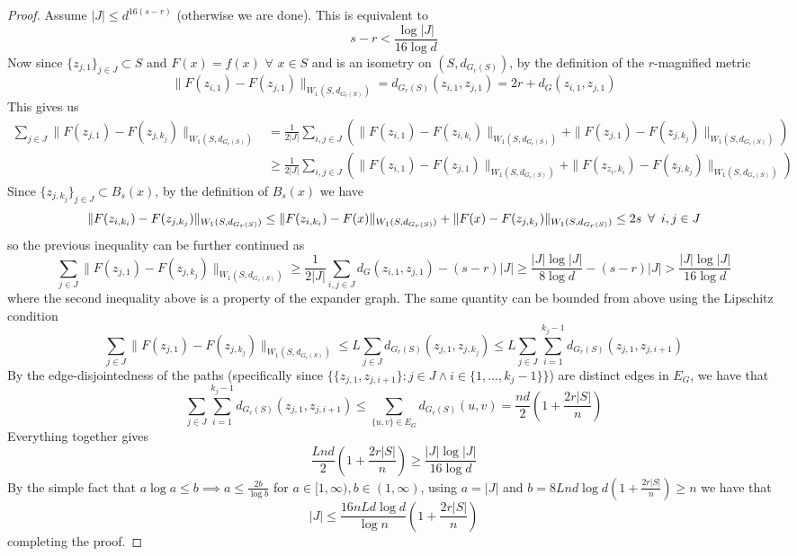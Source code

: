 \begin{proof}
Assume $|J|\le d^{16(s-r)}$ (otherwise we are done). This is equivalent to 
$$s-r<\frac{\log|J|}{16\log d}$$
Now since $\{z_{j,1}\}_{j\in J}\subset S$ and $F(x)=f(x)$ $\forall$ $x\in S$ and is an isometry on $(S,d_{G_r(S)})$, by the definition of the $r$-magnified metric
$$\|F(z_{i,1})-F(z_{j,1})\|_{W_1(S,d_{G_r(S)})}=d_{G_r(S)}(z_{i,1},z_{j,1})=2r+d_G(z_{i,1},z_{j,1})$$
This gives us
\begin{align*}
\sum\limits_{j\in J}\|F(z_{j,1})-F(z_{j,k_j})\|_{W_1(S,d_{G_r(S)})}&=\frac{1}{2|J|}\sum\limits_{i,j\in J}\left(\|F(z_{i,1})-F(z_{i,k_i})\|_{W_1(S,d_{G_r(S)})}+\|F(z_{j,1})-F(z_{j,k_j})\|_{W_1(S,d_{G_r(S)})}\right)\\
&\ge\frac{1}{2|J|}\sum\limits_{i,j\in J}\left(\|F(z_{i,1})-F(z_{j,1})\|_{W_1(S,d_{G_r(S)})}+\|F(z_{z_i,k_i})-F(z_{j,k_j})\|_{W_1(S,d_{G_r(S)})}\right)
\end{align*}
Since $\{z_{j,k_j}\}_{j\in J}\subset B_s(x)$, by the definition of $B_s(x)$ we have 
$$\|F(z_{i,k_i})-F(z_{j,k_j})\|_{W_1(S,d_{G_r(S)})}\le\|F(z_{i,k_i})-F(x)\|_{W_1(S,d_{G_r(S)})}+\|F(x)-F(z_{j,k_j})\|_{W_1(S,d_{G_r(S)})}\le 2s\enskip\forall\enskip i,j\in J$$
so the previous inequality can be further continued as
$$\sum\limits_{j\in J}\|F(z_{j,1})-F(z_{j,k_j})\|_{W_1(S,d_{G_r(S)})}\ge\frac{1}{2|J|}\sum\limits_{i,j\in J}d_G(z_{i,1},z_{j,1})-(s-r)|J|\ge\frac{|J|\log|J|}{8\log d}-(s-r)|J|>\frac{|J|\log|J|}{16\log d}$$
where the second inequality above is a property of the expander graph. The same quantity can be bounded from above using the Lipschitz condition
$$\sum\limits_{j\in J}\|F(z_{j,1})-F(z_{j,k_j})\|_{W_1(S,d_{G_r(S)})}\le L\sum\limits_{j\in J}d_{G_r(S)}(z_{j,1},z_{j,k_j})\le L\sum\limits_{j\in J}\sum\limits_{i=1}^{k_j-1}d_{G_r(S)}(z_{j,1},z_{j,i+1})$$
By the edge-disjointedness of the paths (specifically since $\{\{z_{j,1},z_{j,i+1}\}:j\in J\wedge i\in\{1,\dots,k_j-1\}\}$) are distinct edges in $E_G$, we have that
$$\sum\limits_{j\in J}\sum\limits_{i=1}^{k_j-1}d_{G_r(S)}(z_{j,1},z_{j,i+1})\le\sum\limits_{\{u,v\}\in E_G}d_{G_r(S)}(u,v)=\frac{nd}{2}\left(1+\frac{2r|S|}{n}\right)$$
Everything together gives
$$\frac{Lnd}{2}\left(1+\frac{2r|S|}{n}\right)\ge\frac{|J|\log|J|}{16\log d}$$
By the simple fact that $a\log a\le b\implies a\le\frac{2b}{\log b}$ for $a\in[1,\infty),b\in(1,\infty)$, using $a=|J|$ and $b=8Lnd\log d\left(1+\frac{2r|S|}{n}\right)\ge n$ we have that
$$|J|\le\frac{16nLd\log d}{\log n}\left(1+\frac{2r|S|}{n}\right)$$
completing the proof.
\end{proof}

